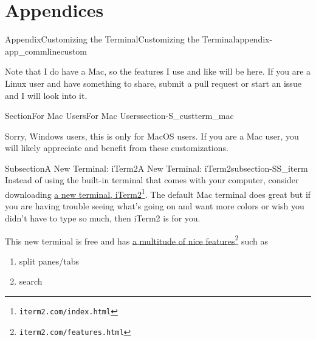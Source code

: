 \documentclass[oneside,10pt,]{book}
\begin{document}
\part*{Appendices}%
%
%
\typeout{************************************************}
\typeout{************************************************}
%
\begin{appendixptx}{Appendix}{Customizing the Terminal}{}{Customizing the Terminal}{}{}{appendix-app_commlinecustom}
\renewcommand*{\appendixname}{Appendix}
%
\begin{introduction}{}%
Note that I do have a Mac, so the features I use and like will be here. If you are a Linux user and have something to share, submit a pull request or start an issue and I will look into it.%
\end{introduction}%
%
%
\typeout{************************************************}
\typeout{************************************************}
%
\begin{sectionptx}{Section}{For Mac Users}{}{For Mac Users}{}{}{section-S_custterm_mac}
%
\begin{introduction}{}%
Sorry, Windows users, this is only for MacOS users. If you are a Mac user, you will likely appreciate and benefit from these customizations.%
\end{introduction}%
%
%
\typeout{************************************************}
\typeout{************************************************}
%
\begin{subsectionptx}{Subsection}{A New Terminal: iTerm2}{}{A New Terminal: iTerm2}{}{}{subsection-SS_iterm}
%
Instead of using the built-in terminal that comes with your computer, consider downloading \href{https://iterm2.com/index.html}{a new terminal, iTerm2}\footnote{\nolinkurl{iterm2.com/index.html}\label{fn-SS_iterm-c-b}}. The default Mac terminal does great but if you are having trouble seeing what's going on and want more colors or wish you didn't have to type so much, then iTerm2 is for you.%
\par
This new terminal is free and has \href{https://iterm2.com/features.html}{a multitude of nice features}\footnote{\nolinkurl{iterm2.com/features.html}\label{fn-SS_iterm-d-b}} such as%
\begin{enumerate}
\item{}split panes\slash{}tabs%
\item{}search%

\end{enumerate}
\end{subsectionptx}
\end{sectionptx}
\end{appendixptx}
\end{document}
